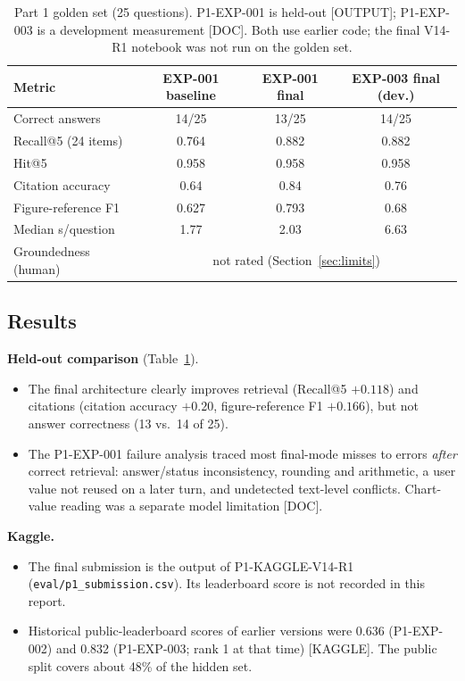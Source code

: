 \documentclass[conference]{IEEEtran}
\begin{document}
\begin{table}[t]\centering\caption{Part 1 golden set (25 questions). P1-EXP-001 is held-out [OUTPUT]; P1-EXP-003 is a development measurement [DOC]. Both use earlier code; the final V14-R1 notebook was not run on the golden set.}\label{tab:p1}\footnotesize
\begin{tabular}{lccc}\toprule
Metric & EXP-001 baseline & EXP-001 final & EXP-003 final (dev.)\\\midrule
Correct answers & 14/25 & 13/25 & 14/25\\
Recall@5 (24 items) & 0.764 & 0.882 & 0.882\\
Hit@5 & 0.958 & 0.958 & 0.958\\
Citation accuracy & 0.64 & 0.84 & 0.76\\
Figure-reference F1 & 0.627 & 0.793 & 0.68\\
Median s/question & 1.77 & 2.03 & 6.63\\
Groundedness (human) & \multicolumn{3}{c}{not rated (Section~\ref{sec:limits})}\\\bottomrule
\end{tabular}\end{table}

\subsection{Results}
\textbf{Held-out comparison} (Table~\ref{tab:p1}).
\begin{itemize}
\item The final architecture clearly improves retrieval (Recall@5 $+0.118$) and citations (citation accuracy $+0.20$, figure-reference F1 $+0.166$), but not answer correctness (13 vs.\ 14 of 25).
\item The P1-EXP-001 failure analysis traced most final-mode misses to errors \emph{after} correct retrieval: answer/status inconsistency, rounding and arithmetic, a user value not reused on a later turn, and undetected text-level conflicts. Chart-value reading was a separate model limitation [DOC].
\end{itemize}

\textbf{Kaggle.}
\begin{itemize}
\item The final submission is the output of P1-KAGGLE-V14-R1 (\texttt{eval/p1\_submission.csv}). Its leaderboard score is not recorded in this report.
\item Historical public-leaderboard scores of earlier versions were 0.636 (P1-EXP-002) and 0.832 (P1-EXP-003; rank 1 at that time) [KAGGLE]. The public split covers about 48\% of the hidden set.
\end{itemize}
\end{document}
